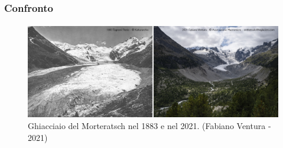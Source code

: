 \begin{frame}
  \frametitle{Confronto}
  \framesubtitle{}
  
  \begin{figure}
    \includegraphics[width=\textwidth]{Immagini/ConfrontoMorteratsch.jpg}
    \caption{Ghiacciaio del Morteratsch nel 1883 e nel 2021. (Fabiano Ventura - 2021)}
  \end{figure}

\end{frame}

